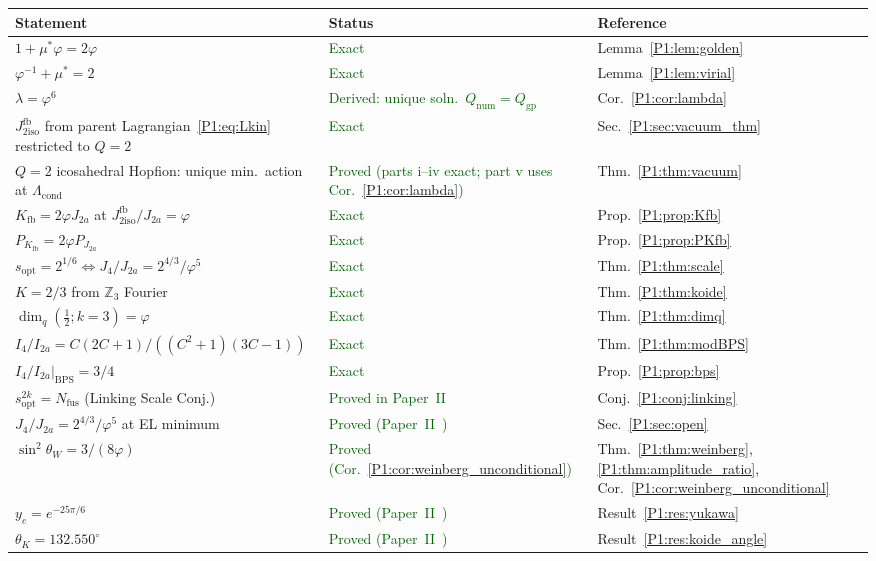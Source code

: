 \documentclass[11pt,a4paper]{article}
\theoremstyle{definition}
\theoremstyle{remark}
\newcommand{\vp}{\varphi}
\newcommand{\ms}{\mu^{*}}
\newcommand{\lam}{\lambda}
\newcommand{\Kfb}{K_{\mathrm{fb}}}
\newcommand{\Jfb}{J_{2\mathrm{iso}}^{\mathrm{fb}}}
\newcommand{\Ja}{J_{2a}}
\newcommand{\Jfour}{J_{4}}
\newcommand{\sopt}{s_{\mathrm{opt}}}
\newcommand{\sinW}{\sin^{2}\!\theta_{W}}
\newcommand{\Lcond}{\Lambda_{\mathrm{cond}}}
\begin{document}
\begin{center}
\renewcommand{\arraystretch}{1.25}
\begin{tabular}{p{6.5cm}p{4.5cm}p{3cm}}
\toprule
Statement & Status & Reference \\
\midrule
$1+\ms\vp = 2\vp$ & \textcolor{darkgreen}{Exact} & Lemma~\ref{P1:lem:golden} \\
$\vp^{-1}+\ms = 2$ & \textcolor{darkgreen}{Exact} & Lemma~\ref{P1:lem:virial} \\
$\lam=\vp^6$ & \textcolor{darkgreen}{Derived: unique soln.\ $Q_\mathrm{num}=Q_\mathrm{gp}$} & Cor.~\ref{P1:cor:lambda} \\
$\Jfb$ from parent Lagrangian~\eqref{P1:eq:Lkin} restricted to $Q=2$ & \textcolor{darkgreen}{Exact} & Sec.~\ref{P1:sec:vacuum_thm} \\
$Q=2$ icosahedral Hopfion: unique min.\ action at $\Lcond$ & \textcolor{darkgreen}{Proved (parts i--iv exact; part v uses Cor.~\ref{P1:cor:lambda})} & Thm.~\ref{P1:thm:vacuum} \\
$\Kfb = 2\vp\Ja$ at $\Jfb/\Ja=\vp$ & \textcolor{darkgreen}{Exact} & Prop.~\ref{P1:prop:Kfb} \\
$P_{\Kfb}=2\vp P_{\Ja}$ & \textcolor{darkgreen}{Exact} & Prop.~\ref{P1:prop:PKfb} \\
$\sopt=2^{1/6}\Leftrightarrow\Jfour/\Ja=2^{4/3}/\vp^5$ & \textcolor{darkgreen}{Exact} & Thm.~\ref{P1:thm:scale} \\
$K=2/3$ from $\mathbb{Z}_3$ Fourier & \textcolor{darkgreen}{Exact} & Thm.~\ref{P1:thm:koide} \\
$\dim_q(\tfrac{1}{2};k{=}3) = \vp$ & \textcolor{darkgreen}{Exact} & Thm.~\ref{P1:thm:dimq} \\
$I_4/I_{2a} = C(2C{+}1)/((C^2{+}1)(3C{-}1))$ & \textcolor{darkgreen}{Exact} & Thm.~\ref{P1:thm:modBPS} \\
$I_4/I_{2a}|_{\mathrm{BPS}} = 3/4$ & \textcolor{darkgreen}{Exact} & Prop.~\ref{P1:prop:bps} \\
$\sopt^{2k}=N_{\mathrm{fus}}$ (Linking Scale Conj.) & \textcolor{darkgreen}{Proved in Paper~II~\cite{Paper2}} & Conj.~\ref{P1:conj:linking} \\
$\Jfour/\Ja = 2^{4/3}/\vp^5$ at EL minimum & \textcolor{darkgreen}{Proved (Paper~II~\cite{Paper2})} & Sec.~\ref{P1:sec:open} \\
$\sinW = 3/(8\vp)$ & \textcolor{darkgreen}{Proved (Cor.~\ref{P1:cor:weinberg_unconditional})} & Thm.~\ref{P1:thm:weinberg}, \ref{P1:thm:amplitude_ratio}, Cor.~\ref{P1:cor:weinberg_unconditional} \\
$y_e = e^{-25\pi/6}$ & \textcolor{darkgreen}{Proved (Paper~II~\cite{Paper2})} & Result~\ref{P1:res:yukawa} \\
$\theta_K = 132.550^\circ$ & \textcolor{darkgreen}{Proved (Paper~II~\cite{Paper2})} & Result~\ref{P1:res:koide_angle} \\
\bottomrule
\end{tabular}
\end{center}
\end{document}
